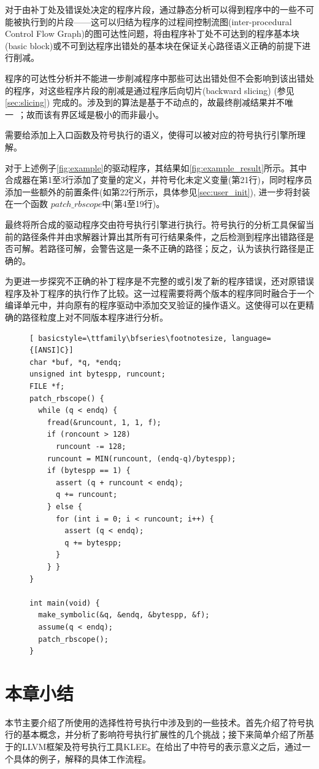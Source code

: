对于由补丁处及错误处决定的程序片段，通过静态分析可以得到程序中的一些不可能被执行到的片段——这可以归结为程序的过程间控制流图(inter-procedural Control Flow Graph)的图可达性问题，将由程序补丁处不可达到的程序基本块(basic block)或不可到达程序出错处的基本块在保证关心路径语义正确的前提下进行削减。

程序的可达性分析并不能进一步削减程序中那些可达出错处但不会影响到该出错处的程序，对这些程序片段的削减是通过程序后向切片(backward slicing) (参见\ref{sec:slicing}) 完成的。涉及到的算法是基于不动点的，故最终削减结果并不唯一~；故而该有界区域是极小的而非最小。

\dryrun 需要给\rbscope 添加上入口函数及符号执行的语义，使得可以被对应的符号执行引擎所理解。

对于上述例子\autoref{fig:example}的驱动程序，其结果如\autoref{fig:example_result}所示。其中合成器在第1至3行添加了变量的定义，并符号化未定义变量(第21行)，同时程序员添加一些额外的前置条件(如第22行所示，具体参见\autoref{sec:user_init}), 进一步将\rbscope 封装在一个函数 $patch\_rbscope$中(第4至19行)。

最终将所合成的驱动程序交由符号执行引擎进行执行。符号执行的分析工具保留当前的路径条件并由求解器计算出其所有可行结果条件，之后检测到程序出错路径是否可解。若路径可解，\dryrun 会警告这是一条不正确的路径；反之，认为该执行路径是正确的。

为更进一步探究不正确的补丁程序是不完整的或引发了新的程序错误，\dryrun 还对原错误程序及补丁程序的执行作了比较。这一过程需要将两个版本的程序同时融合于一个编译单元中，并向原有的程序驱动中添加交叉验证的操作语义。这使得可以在更精确的路径粒度上对不同版本程序进行分析。

\begin{figure}[t]
\begin{center}
\begin{lstlisting}[ basicstyle=\ttfamily\bfseries\footnotesize, language={[ANSI]C}]
char *buf, *q, *endq;
unsigned int bytespp, runcount;
FILE *f;
patch_rbscope() {
  while (q < endq) {
    fread(&runcount, 1, 1, f);
    if (roncount > 128)
      runcount -= 128;
    runcount = MIN(runcount, (endq-q)/bytespp);
    if (bytespp == 1) {
      assert (q + runcount < endq);
      q += runcount;
    } else {
      for (int i = 0; i < runcount; i++) {
        assert (q < endq);
        q += bytespp;
      }
    } }
}

int main(void) {
  make_symbolic(&q, &endq, &bytespp, &f);
  assume(q < endq);
  patch_rbscope();
}
\end{lstlisting}
\vspace{-0.5cm}
\end{center}
\end{figure}

\section{本章小结}
\label{sec:c2}
本节主要介绍了\dryrun 所使用的选择性符号执行中涉及到的一些技术。首先介绍了符号执行的基本概念，并分析了影响符号执行扩展性的几个挑战；接下来简单介绍了\dryrun 所基于的LLVM框架及符号执行工具KLEE。在给出了中符号的表示意义之后，通过一个具体的例子，解释\dryrun 的具体工作流程。